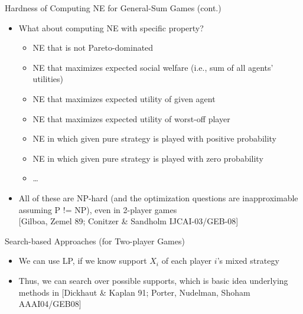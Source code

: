 \documentclass[11pt,aspectratio=169,handout]{beamer}
\begin{document}
  \begin{frame}{Hardness of Computing NE for General-Sum Games (cont.)}
   \begin{itemize}[<+->]
    \item What about computing NE with \alert{specific property}?
    \begin{itemize}[<.->]
     \item NE that is not Pareto-dominated
     \item NE that maximizes expected social welfare (i.e., sum of all agents’ utilities)
     \item NE that maximizes expected utility of given agent
     \item NE that maximizes expected utility of worst-off player
     \item NE in which given pure strategy is played with positive probability
     \item NE in which given pure strategy is played with zero probability
     \item …
    \end{itemize}
    \item All of these are NP-hard (and the optimization questions are
 inapproximable assuming P != NP), even in 2-player games \\
 {\scriptsize [Gilboa, Zemel 89; Conitzer \& Sandholm IJCAI-03/GEB-08]}
   \end{itemize}
  \end{frame}

  \begin{frame}{Search-based Approaches (for Two-player Games)}
   \begin{itemize}
    \item<1-> We can use LP, if we know support $X_i$ of each player $i$’s mixed strategy
    \item<3-> Thus, we can search over possible supports, which is basic idea underlying methods in {\scriptsize \color[rgb]{0.29, 0.59, 0.9} [Dickhaut \& Kaplan 91; Porter, Nudelman, Shoham AAAI04/GEB08]}
   \end{itemize}
  \end{frame}
\end{document}
